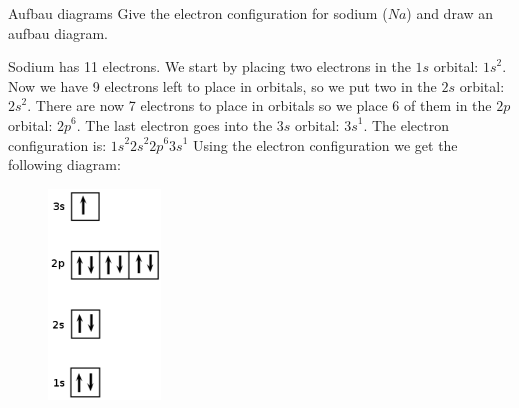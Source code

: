 \begin{wex}
{%
Aufbau diagrams
}
{%
Give the electron configuration for sodium ($Na$) and draw an aufbau diagram.
}
{%
\westep{} Sodium has 11 electrons.
\westep{} We start by placing two electrons in the $1s$ orbital: ${1s}^{2}$. Now we have 9 electrons left to place in orbitals, so we put two in the $2s$ orbital: ${2s}^{2}$. There are now 7 electrons to place in orbitals so we place 6 of them in the $2p$ orbital: ${2p}^{6}$. The last electron goes into the $3s$ orbital: ${3s}^{1}$.
\westep{} The electron configuration is: ${1s}^{2}{2s}^{2}{2p}^{6}{3s}^{1}$
\westep{} Using the electron configuration we get the following diagram:
    \setcounter{subfigure}{0}
	\begin{figure}[H] %
    \begin{center}
    \label{m38741*uid847!!!underscore!!!media}\label{m38741*uid847!!!underscore!!!printimage}\includegraphics[width=3cm]{col11305.imgs/m38126_wexaufbau.png} %
      \vspace{2pt}
    \vspace{.1in}
    \end{center}
 \end{figure}      
} 
\end{wex}


